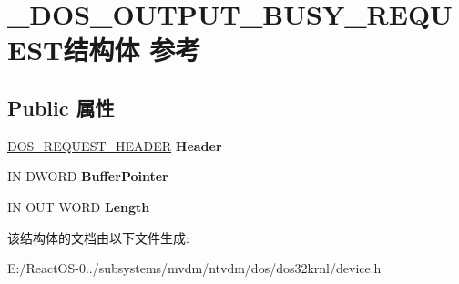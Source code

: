 \hypertarget{struct___d_o_s___o_u_t_p_u_t___b_u_s_y___r_e_q_u_e_s_t}{}\section{\+\_\+\+D\+O\+S\+\_\+\+O\+U\+T\+P\+U\+T\+\_\+\+B\+U\+S\+Y\+\_\+\+R\+E\+Q\+U\+E\+S\+T结构体 参考}
\label{struct___d_o_s___o_u_t_p_u_t___b_u_s_y___r_e_q_u_e_s_t}
\subsection*{Public 属性}
\begin{DoxyCompactItemize}
\item 
\mbox{\label{struct___d_o_s___o_u_t_p_u_t___b_u_s_y___r_e_q_u_e_s_t_a708c5acfa523a918f09f366766cdc253}} 
\hyperlink{struct___d_o_s___r_e_q_u_e_s_t___h_e_a_d_e_r}{D\+O\+S\+\_\+\+R\+E\+Q\+U\+E\+S\+T\+\_\+\+H\+E\+A\+D\+ER} {\bfseries Header}
\item 
\mbox{\label{struct___d_o_s___o_u_t_p_u_t___b_u_s_y___r_e_q_u_e_s_t_adeab4fb9ed7d97947df59e343112e197}} 
IN D\+W\+O\+RD {\bfseries Buffer\+Pointer}
\item 
\mbox{\label{struct___d_o_s___o_u_t_p_u_t___b_u_s_y___r_e_q_u_e_s_t_a944efe22b5bd71d12a4c576178bfbcc3}} 
IN O\+UT W\+O\+RD {\bfseries Length}
\end{DoxyCompactItemize}


该结构体的文档由以下文件生成\+:\begin{DoxyCompactItemize}
\item 
E\+:/\+React\+O\+S-\/0../subsystems/mvdm/ntvdm/dos/dos32krnl/device.\+h\end{DoxyCompactItemize}

